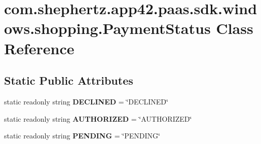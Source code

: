 \hypertarget{classcom_1_1shephertz_1_1app42_1_1paas_1_1sdk_1_1windows_1_1shopping_1_1_payment_status}{\section{com.\+shephertz.\+app42.\+paas.\+sdk.\+windows.\+shopping.\+Payment\+Status Class Reference}
\label{classcom_1_1shephertz_1_1app42_1_1paas_1_1sdk_1_1windows_1_1shopping_1_1_payment_status}
}
\subsection*{Static Public Attributes}
\begin{DoxyCompactItemize}
\item 
\hypertarget{classcom_1_1shephertz_1_1app42_1_1paas_1_1sdk_1_1windows_1_1shopping_1_1_payment_status_a7995201b994655918b74d3963ffc445c}{static readonly string {\bfseries D\+E\+C\+L\+I\+N\+E\+D} = \char`\"{}D\+E\+C\+L\+I\+N\+E\+D\char`\"{}}\label{classcom_1_1shephertz_1_1app42_1_1paas_1_1sdk_1_1windows_1_1shopping_1_1_payment_status_a7995201b994655918b74d3963ffc445c}

\item 
\hypertarget{classcom_1_1shephertz_1_1app42_1_1paas_1_1sdk_1_1windows_1_1shopping_1_1_payment_status_a15279a424f0610382877f18fe479b663}{static readonly string {\bfseries A\+U\+T\+H\+O\+R\+I\+Z\+E\+D} = \char`\"{}A\+U\+T\+H\+O\+R\+I\+Z\+E\+D\char`\"{}}\label{classcom_1_1shephertz_1_1app42_1_1paas_1_1sdk_1_1windows_1_1shopping_1_1_payment_status_a15279a424f0610382877f18fe479b663}

\item 
\hypertarget{classcom_1_1shephertz_1_1app42_1_1paas_1_1sdk_1_1windows_1_1shopping_1_1_payment_status_ae5b03e7f5092a0e7e104283f8212f802}{static readonly string {\bfseries P\+E\+N\+D\+I\+N\+G} = \char`\"{}P\+E\+N\+D\+I\+N\+G\char`\"{}}\label{classcom_1_1shephertz_1_1app42_1_1paas_1_1sdk_1_1windows_1_1shopping_1_1_payment_status_ae5b03e7f5092a0e7e104283f8212f802}

\end{DoxyCompactItemize}
